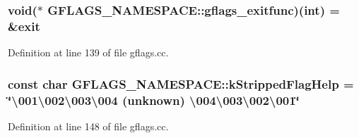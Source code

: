 \subsubsection[{\texorpdfstring{gflags\+\_\+exitfunc}{gflags_exitfunc}}]{ void($\ast$ G\+F\+L\+A\+G\+S\+\_\+\+N\+A\+M\+E\+S\+P\+A\+C\+E\+::gflags\+\_\+exitfunc)({\bf int}) = \&exit}\hypertarget{namespaceGFLAGS__NAMESPACE_a92540f20c8cabd198b987ac84a539078}{}\label{namespaceGFLAGS__NAMESPACE_a92540f20c8cabd198b987ac84a539078}


Definition at line 139 of file gflags.\+cc.

\subsubsection[{\texorpdfstring{k\+Stripped\+Flag\+Help}{kStrippedFlagHelp}}]{\setlength{\rightskip}{0pt plus 5cm}const {\bf char} G\+F\+L\+A\+G\+S\+\_\+\+N\+A\+M\+E\+S\+P\+A\+C\+E\+::k\+Stripped\+Flag\+Help = \char`\"{}\textbackslash{}001\textbackslash{}002\textbackslash{}003\textbackslash{}004 (unknown) \textbackslash{}004\textbackslash{}003\textbackslash{}002\textbackslash{}001\char`\"{}}\hypertarget{namespaceGFLAGS__NAMESPACE_a6051161932d2b5445384f4a6a264d75b}{}\label{namespaceGFLAGS__NAMESPACE_a6051161932d2b5445384f4a6a264d75b}


Definition at line 148 of file gflags.\+cc.

